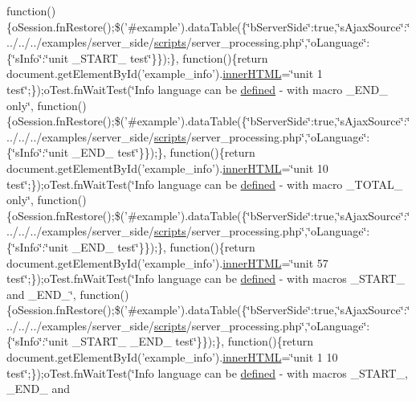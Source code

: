 \begin{DoxyCompactItemize}
function()\{o\+Session.\+fn\+Restore();\$('\#example').data\+Table(\{\char`\"{}b\+Server\+Side\char`\"{}\+:true,\char`\"{}s\+Ajax\+Source\char`\"{}\+:\char`\"{}../../../examples/server\+\_\+side/\hyperlink{tinymce_8jquery_8dev_8js_a09066d4d580eeec222f858d588b4cdef}{scripts}/server\+\_\+processing.\+php\char`\"{},\char`\"{}o\+Language\char`\"{}\+:\{\char`\"{}s\+Info\char`\"{}\+:\char`\"{}unit \+\_\+\+S\+T\+A\+R\+T\+\_\+ test\char`\"{}\}\});\}, function()\{return document.\+get\+Element\+By\+Id('example\+\_\+info').\hyperlink{jquery-ui_8js_a87f73c4f0391c1cf9fe60374a76d9a7b}{inner\+H\+T\+M\+L}=\char`\"{}unit 1 test\char`\"{};\});o\+Test.\+fn\+Wait\+Test(\char`\"{}Info language can be \hyperlink{tinymce_8js_a8cb6212cde9926d156ab5912c9b547cf}{defined} -\/ with macro \+\_\+\+E\+N\+D\+\_\+ only\char`\"{}, function()\{o\+Session.\+fn\+Restore();\$('\#example').data\+Table(\{\char`\"{}b\+Server\+Side\char`\"{}\+:true,\char`\"{}s\+Ajax\+Source\char`\"{}\+:\char`\"{}../../../examples/server\+\_\+side/\hyperlink{tinymce_8jquery_8dev_8js_a09066d4d580eeec222f858d588b4cdef}{scripts}/server\+\_\+processing.\+php\char`\"{},\char`\"{}o\+Language\char`\"{}\+:\{\char`\"{}s\+Info\char`\"{}\+:\char`\"{}unit \+\_\+\+E\+N\+D\+\_\+ test\char`\"{}\}\});\}, function()\{return document.\+get\+Element\+By\+Id('example\+\_\+info').\hyperlink{jquery-ui_8js_a87f73c4f0391c1cf9fe60374a76d9a7b}{inner\+H\+T\+M\+L}=\char`\"{}unit 10 test\char`\"{};\});o\+Test.\+fn\+Wait\+Test(\char`\"{}Info language can be \hyperlink{tinymce_8js_a8cb6212cde9926d156ab5912c9b547cf}{defined} -\/ with macro \+\_\+\+T\+O\+T\+A\+L\+\_\+ only\char`\"{}, function()\{o\+Session.\+fn\+Restore();\$('\#example').data\+Table(\{\char`\"{}b\+Server\+Side\char`\"{}\+:true,\char`\"{}s\+Ajax\+Source\char`\"{}\+:\char`\"{}../../../examples/server\+\_\+side/\hyperlink{tinymce_8jquery_8dev_8js_a09066d4d580eeec222f858d588b4cdef}{scripts}/server\+\_\+processing.\+php\char`\"{},\char`\"{}o\+Language\char`\"{}\+:\{\char`\"{}s\+Info\char`\"{}\+:\char`\"{}unit \+\_\+\+E\+N\+D\+\_\+ test\char`\"{}\}\});\}, function()\{return document.\+get\+Element\+By\+Id('example\+\_\+info').\hyperlink{jquery-ui_8js_a87f73c4f0391c1cf9fe60374a76d9a7b}{inner\+H\+T\+M\+L}=\char`\"{}unit 57 test\char`\"{};\});o\+Test.\+fn\+Wait\+Test(\char`\"{}Info language can be \hyperlink{tinymce_8js_a8cb6212cde9926d156ab5912c9b547cf}{defined} -\/ with macros \+\_\+\+S\+T\+A\+R\+T\+\_\+ and \+\_\+\+E\+N\+D\+\_\+\char`\"{}, function()\{o\+Session.\+fn\+Restore();\$('\#example').data\+Table(\{\char`\"{}b\+Server\+Side\char`\"{}\+:true,\char`\"{}s\+Ajax\+Source\char`\"{}\+:\char`\"{}../../../examples/server\+\_\+side/\hyperlink{tinymce_8jquery_8dev_8js_a09066d4d580eeec222f858d588b4cdef}{scripts}/server\+\_\+processing.\+php\char`\"{},\char`\"{}o\+Language\char`\"{}\+:\{\char`\"{}s\+Info\char`\"{}\+:\char`\"{}unit \+\_\+\+S\+T\+A\+R\+T\+\_\+ \+\_\+\+E\+N\+D\+\_\+ test\char`\"{}\}\});\}, function()\{return document.\+get\+Element\+By\+Id('example\+\_\+info').\hyperlink{jquery-ui_8js_a87f73c4f0391c1cf9fe60374a76d9a7b}{inner\+H\+T\+M\+L}=\char`\"{}unit 1 10 test\char`\"{};\});o\+Test.\+fn\+Wait\+Test(\char`\"{}Info language can be \hyperlink{tinymce_8js_a8cb6212cde9926d156ab5912c9b547cf}{defined} -\/ with macros \+\_\+\+S\+T\+A\+R\+T\+\_\+, \+\_\+\+E\+N\+D\+\_\+ and 
\end{DoxyCompactItemize}
